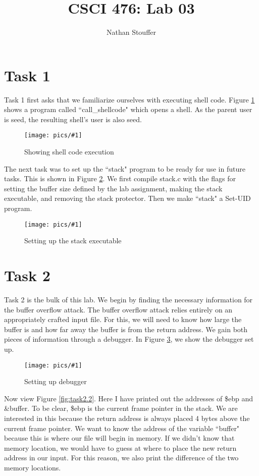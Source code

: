 \documentclass[11pt]{article}
\newcommand{\fig}[2]{ 
\begin{figure}[h]
	\centering
	\caption{#2}
	\texttt{[image: pics/\#1]}
	\label{fig:#1}
\end{figure} 
}
\begin{document}
\title{CSCI 476: Lab 03}
\author{Nathan Stouffer}
\maketitle
\newpage

\section*{Task 1}

Task 1 first asks that we familiarize ourselves with executing shell code. Figure \ref{fig:task1.1} shows a program called ``call\_shellcode" which opens a shell. As the parent user is seed, the resulting shell's user is also seed. 

\fig{task1.1}{Showing shell code execution}

The next task was to set up the ``stack" program to be ready for use in future tasks. This is shown in Figure \ref{fig:task1.2}. We first compile stack.c with the flags for setting the buffer size defined by the lab assignment, making the stack executable, and removing the stack protector. Then we make ``stack" a Set-UID program.

\fig{task1.2}{Setting up the stack executable}

\newpage

\section*{Task 2}

Task 2 is the bulk of this lab. We begin by finding the necessary information for the buffer overflow attack. The buffer overflow attack relies entirely on an appropriately crafted input file. For this, we will need to know how large the buffer is and how far away the buffer is from the return address. We gain both pieces of information through a debugger. In Figure \ref{fig:task2.1}, we show the debugger set up.

\fig{task2.1}{Setting up debugger}

Now view Figure \ref{fig:task2.2}. Here I have printed out the addresses of \$ebp and \&buffer. To be clear, \$ebp is the current frame pointer in the stack. We are interested in this because the return address is always placed 4 bytes above the current frame pointer. We want to know the address of the variable ``buffer" because this is where our file will begin in memory. If we didn't know that memory location, we would have to guess at where to place the new return address in our input. For this reason, we also print the difference of the two memory locations.
\end{document}
